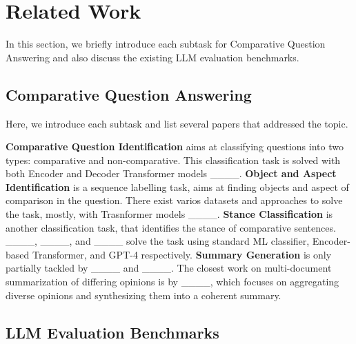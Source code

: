 \section{Related Work}
In this section, we briefly introduce each subtask for Comparative Question Answering and also discuss the existing LLM evaluation benchmarks.


\subsection{Comparative Question Answering}

Here, we introduce each subtask and list several papers that addressed the topic.

\textbf{Comparative Question Identification} aims at classifying questions into two types: comparative and non-comparative. This classification task is solved with both Encoder and Decoder Transformer models ____.
\textbf{Object and Aspect Identification} is a sequence labelling task, aims at finding objects and aspect of comparison in the question. There exist varios datasets and approaches to solve the task, mostly, with Trasnformer models ____.
\textbf{Stance Classification} is another classification task, that identifies the stance of comparative sentences.  ____, ____, and ____ solve the task using standard ML classifier, Encoder-based Transformer, and GPT-4 respectively.
\textbf{Summary Generation} is only partially tackled by ____ and ____. The closest work on multi-document summarization of differing opinions is by ____, which focuses on aggregating diverse opinions and synthesizing them into a coherent summary.

\subsection{LLM Evaluation Benchmarks}
 


